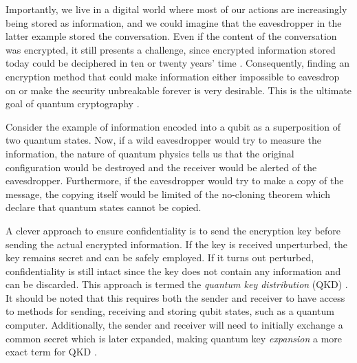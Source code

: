Importantly, we live in a digital world where most of our actions are increasingly being stored as information, and we could imagine that the eavesdropper in the latter example stored the conversation. Even if the content of the conversation was encrypted, it still presents a challenge, since encrypted information stored today could be deciphered in ten or twenty years' time
. Consequently, finding an encryption method that could make information either impossible to eavesdrop on or make the security unbreakable forever is very desirable. This is the ultimate goal of quantum cryptography \cite{Pavicic2006}.

Consider the example of information encoded into a qubit as a superposition of two quantum states. Now, if a wild eavesdropper would try to measure the information, the nature of quantum physics tells us that the original configuration would be destroyed and the receiver would be alerted of the eavesdropper. Furthermore, if the eavesdropper would try to make a copy of the message, the copying itself would be limited of the no-cloning theorem \cite{Gisin2002} which declare that quantum states cannot be copied.

A clever approach to ensure confidentiality is to send the encryption key before sending the actual encrypted information. If the key is received unperturbed, the key remains secret and can be safely employed. If it turns out perturbed, confidentiality is still intact since the key does not contain any information and can be discarded. This approach is termed the \textit{quantum key distribution} (QKD) \cite{Gisin2002, Gisin2007}. It should be noted that this requires both the sender and receiver to have access to methods for sending, receiving and storing qubit states, such as a quantum computer. Additionally, the sender and receiver will need to initially exchange a common secret which is later expanded, making quantum key \textit{expansion} a more exact term for QKD \cite{Pavicic2006, Gisin2007}.

